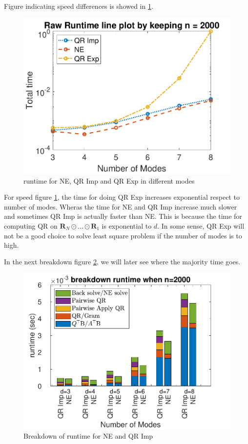 \documentclass{article}
\newcommand{\mat}[1]{\mathbf{#1}}
\begin{document}
Figure indicating speed differences is showed in \cref{fig:LS_problem_line}.
\begin{figure}[ht!]
  \begin{center}
    \includegraphics[scale = 0.7]{lineplot_p.pdf}
    \caption[Figure]{runtime for NE, QR Imp and QR Exp in different modes \label{fig:LS_problem_line}}
  \end{center}
\end{figure}


For speed figure \cref{fig:LS_problem_line}, the time for doing QR Exp increases exponential respect to number of modes.
Wheras the time for NE and QR Imp increase much slower and sometimes QR Imp is actually faster than NE.
This is because the time for computing QR on $\mat{R}_N \odot \dots \odot \mat{R}_1$ is exponential to $d$.
In some sense, QR Exp will not be a good choice to solve least square problem if the number of modes is to high.

In the next breakdown figure \cref{fig:LS_problem_breakdown}, we will later see where the majority time goes.
\begin{figure}[ht!]
  \begin{center}
    \includegraphics[scale = 0.8]{breakdown_p.pdf}
    \caption[Figure]{Breakdown of runtime for NE and QR Imp\label{fig:LS_problem_breakdown}}
  \end{center}
\end{figure}
\end{document}
